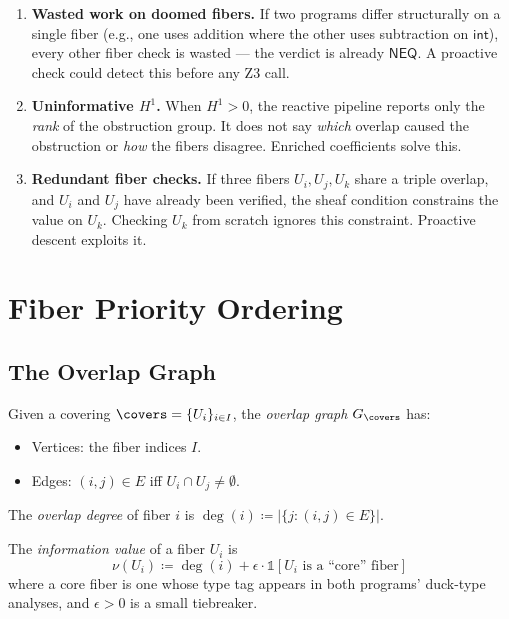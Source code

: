 \begin{enumerate}
  \item \textbf{Wasted work on doomed fibers.}
    If two programs differ structurally on a single fiber (e.g.,
    one uses addition where the other uses subtraction on
    $\mathsf{int}$), every other fiber check is wasted ---
    the verdict is already $\mathsf{NEQ}$.  A proactive check
    could detect this before any Z3 call.

  \item \textbf{Uninformative $H^1$.}
    When $H^1 > 0$, the reactive pipeline reports only the
    \emph{rank} of the obstruction group.  It does not say
    \emph{which} overlap caused the obstruction or \emph{how}
    the fibers disagree.  Enriched coefficients solve this.

  \item \textbf{Redundant fiber checks.}
    If three fibers $U_i, U_j, U_k$ share a triple overlap, and
    $U_i$ and $U_j$ have already been verified, the sheaf condition
    constrains the value on $U_k$.  Checking $U_k$ from scratch
    ignores this constraint.  Proactive descent exploits it.
\end{enumerate}


\section{Fiber Priority Ordering}
\label{sec:fiber-priority}

\subsection{The Overlap Graph}

\begin{definition}
\label{def:overlap-graph}
Given a covering $\covers = \{U_i\}_{i \in I}$, the
\emph{overlap graph} $G_{\covers}$ has:
\begin{itemize}
  \item Vertices: the fiber indices $I$.
  \item Edges: $(i, j) \in E$ iff $U_i \cap U_j \neq \emptyset$.
\end{itemize}
The \emph{overlap degree} of fiber $i$ is
$\deg(i) \coloneqq |\{j : (i,j) \in E\}|$.
\end{definition}

\begin{definition}
\label{def:information-value}
The \emph{information value} of a fiber $U_i$ is
\[
  \nu(U_i) \coloneqq \deg(i) + \epsilon \cdot \mathbb{1}[\text{$U_i$ is a ``core'' fiber}]
\]
where a core fiber is one whose type tag appears in both programs'
duck-type analyses, and $\epsilon > 0$ is a small tiebreaker.
\end{definition}


